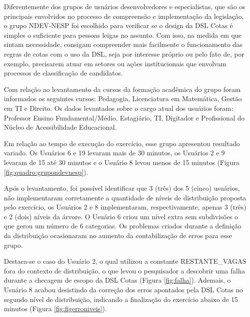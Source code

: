 Diferentemente dos grupos de usuários desenvolvedores e especialistas, que são os principais envolvidos no processo de compreensão e implementação da legislação, o grupo NDEV-NESP foi escolhido para verificar se o design da DSL Cotas é simples o suficiente para pessoas leigas no assunto. Com isso, na medida em que sintam necessidade, consigam compreender mais facilmente o funcionamento das regras de cotas com o uso da DSL, seja por interesse próprio ou pelo fato de, por exemplo, precisarem atuar em setores ou ações institucionais que envolvam processos de classificação de candidatos.


Com relação ao levantamento da cursos da formação acadêmica do grupo foram informados os seguintes cursos: Pedagogia, Licenciatura em Matemática, Gestão em TI e Direito. Os dados levantados sobre o cargo atual dos usuários foram: Professor Ensino Fundamental/Médio, Estagiário, TI, Digitador e Profissional do Núcleo de Acessibilidade Educacional.

Em relação ao tempo de execução do exercício, esse grupo apresentou resultado variado. Os Usuários 6 e 19 levaram mais de 30 minutos, os Usuários 2 e 9 levaram de 15 até 30 minutos e o Usuário 8 levou menos de 15 minutos (Figura \ref{fig:quadro:grupondevnesp}). 



\newpage

Após o levantamento, foi possível identificar que 3 (três) dos 5 (cinco) usuários, não implementaram corretamente a quantidade de níveis de distribuição proposta pelo exercício, os Usuários 2 e 8 implementaram, respectivamente, apenas 3 (três) e 2 (dois) níveis da árvore. O Usuário 6 criou um nível extra sem subdivisões o que gerou um número de 6 categorias. Os problemas criados durante a definição da distribuição ocasionaram no aumento da contabilização de erros para esse grupo. 

\newpage
Destaca-se o caso do Usuário 2, o qual utilizou a constante RESTANTE\_VAGAS fora do contexto de distribuição, o que levou o pesquisador a descobrir uma falha durante a checagem de escopo da DSL Cotas (Figura \ref{fig:falha}). Ademais, o Usuário 8 acabou desistindo da correção dos erros apontados pela DSL Cotas no segundo nível de distribuição, indicando a finalização do exercício abaixo de 15 minutos (Figura \ref{fig:figerroniveis}).





